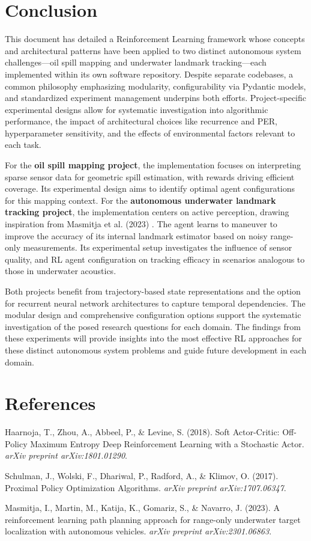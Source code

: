 \documentclass[11pt,a4paper]{article}
\begin{document}
\section{Conclusion}
This document has detailed a Reinforcement Learning framework whose concepts and architectural patterns have been applied to two distinct autonomous system challenges—oil spill mapping and underwater landmark tracking—each implemented within its own software repository. Despite separate codebases, a common philosophy emphasizing modularity, configurability via Pydantic models, and standardized experiment management underpins both efforts. Project-specific experimental designs allow for systematic investigation into algorithmic performance, the impact of architectural choices like recurrence and PER, hyperparameter sensitivity, and the effects of environmental factors relevant to each task.

For the \textbf{oil spill mapping project}, the implementation focuses on interpreting sparse sensor data for geometric spill estimation, with rewards driving efficient coverage. Its experimental design aims to identify optimal agent configurations for this mapping context.
For the \textbf{autonomous underwater landmark tracking project}, the implementation centers on active perception, drawing inspiration from Masmitja et al. (2023) \cite{masmitja2023tracking}. The agent learns to maneuver to improve the accuracy of its internal landmark estimator based on noisy range-only measurements. Its experimental setup investigates the influence of sensor quality, and RL agent configuration on tracking efficacy in scenarios analogous to those in underwater acoustics.

Both projects benefit from trajectory-based state representations and the option for recurrent neural network architectures to capture temporal dependencies. The modular design and comprehensive configuration options support the systematic investigation of the posed research questions for each domain. The findings from these experiments will provide insights into the most effective RL approaches for these distinct autonomous system problems and guide future development in each domain.

\section*{References}
\begin{thebibliography}{99} %
    Haarnoja, T., Zhou, A., Abbeel, P., \& Levine, S. (2018). Soft Actor-Critic: Off-Policy Maximum Entropy Deep Reinforcement Learning with a Stochastic Actor. \textit{arXiv preprint arXiv:1801.01290}.

    Schulman, J., Wolski, F., Dhariwal, P., Radford, A., \& Klimov, O. (2017). Proximal Policy Optimization Algorithms. \textit{arXiv preprint arXiv:1707.06347}.

    Masmitja, I., Martin, M., Katija, K., Gomariz, S., \& Navarro, J. (2023). A reinforcement learning path planning approach for range-only underwater target localization with autonomous vehicles. \textit{arXiv preprint arXiv:2301.06863}.
\end{thebibliography}
\end{document}
